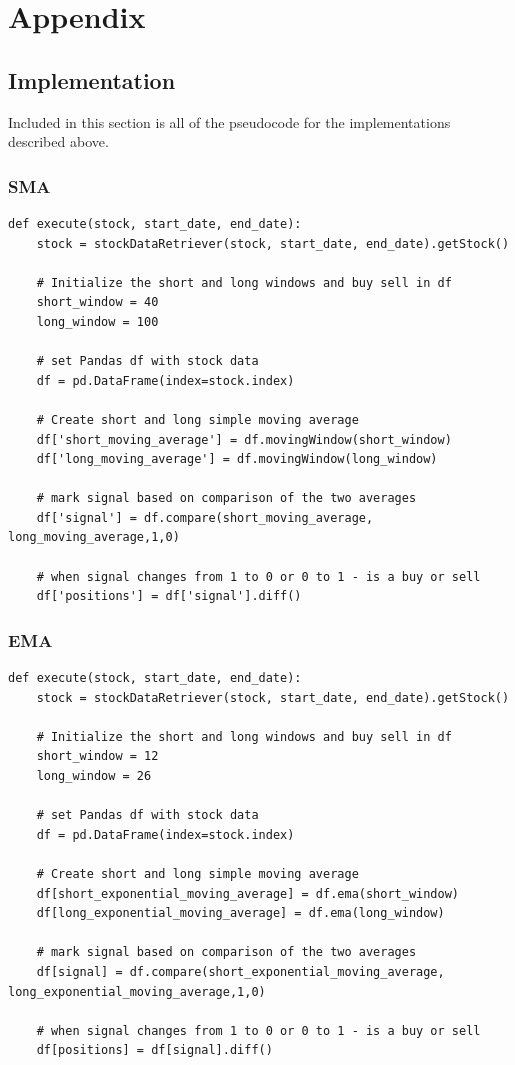 \documentclass[letterpaper,11pt]{article}
\begin{document}
\section{Appendix}

\subsection{Implementation}

Included in this section is all of the pseudocode for the implementations described above.

\subsubsection{SMA}

\begin{verbatim}
def execute(stock, start_date, end_date):
    stock = stockDataRetriever(stock, start_date, end_date).getStock()

    # Initialize the short and long windows and buy sell in df
    short_window = 40
    long_window = 100
    
    # set Pandas df with stock data
    df = pd.DataFrame(index=stock.index)

    # Create short and long simple moving average 
    df['short_moving_average'] = df.movingWindow(short_window)
    df['long_moving_average'] = df.movingWindow(long_window)
    
    # mark signal based on comparison of the two averages
    df['signal'] = df.compare(short_moving_average, long_moving_average,1,0)
    
    # when signal changes from 1 to 0 or 0 to 1 - is a buy or sell
    df['positions'] = df['signal'].diff()

\end{verbatim}

\subsubsection{EMA }

\begin{verbatim}
def execute(stock, start_date, end_date):
    stock = stockDataRetriever(stock, start_date, end_date).getStock()

    # Initialize the short and long windows and buy sell in df
    short_window = 12
    long_window = 26

    # set Pandas df with stock data
    df = pd.DataFrame(index=stock.index)

    # Create short and long simple moving average
    df[short_exponential_moving_average] = df.ema(short_window)
    df[long_exponential_moving_average] = df.ema(long_window)

    # mark signal based on comparison of the two averages
    df[signal] = df.compare(short_exponential_moving_average, long_exponential_moving_average,1,0)

    # when signal changes from 1 to 0 or 0 to 1 - is a buy or sell
    df[positions] = df[signal].diff()

\end{verbatim}
\end{document}
